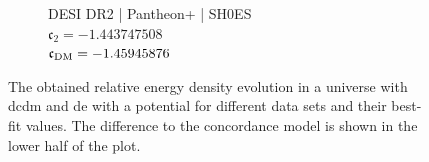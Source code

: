 \begin{figure}[htbp]
	\hspace*{\fill}
	\begin{subfigure}[t]{0.49\textwidth}
		\centering
		\resizebox{\linewidth}{!}{%
		}
		\caption{DESI DR2 | Pantheon+ | SH0ES\\$\mathfrak{c}_2 = -1.443747508$\\$\mathfrak{c}_{\textnormal{DM}} = -1.45945876$}
		\label{fig:HyperbolicOmega:PPSD}
	\end{subfigure}
	\hspace*{\fill}

	\tagstructend
	\caption[Relative energy density evolution.]{The obtained relative energy density evolution in a universe with \gls{dc}\gls{dm} and \gls{de} with a  potential for different data sets and their best-fit values. The difference to the concordance model is shown in the lower half of the plot.}
	\label{fig:HyperbolicOmega}
\end{figure}
